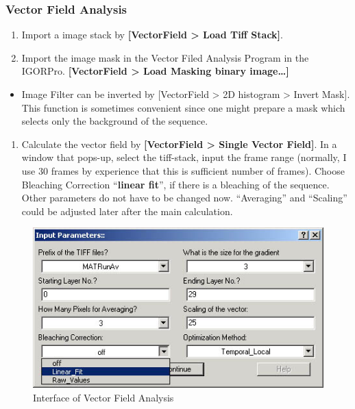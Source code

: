 \documentclass{article}
\begin{document}
\subsubsection{Vector Field Analysis}\label{vector-field-analysis}

\begin{enumerate}
\def\labelenumi{\arabic{enumi}.}
\item
  Import a image stack by \textbf{{[}VectorField \textgreater{} Load
  Tiff Stack{]}}.
\item
  Import the image mask in the Vector Filed Analysis Program in the
  IGORPro. \textbf{{[}VectorField \textgreater{} Load Masking binary
  image\ldots{}{]}}
\end{enumerate}

\begin{itemize}
\itemsep1pt\parskip0pt
\item
  Image Filter can be inverted by {[}VectorField \textgreater{} 2D
  histogram \textgreater{} Invert Mask{]}. This function is sometimes
  convenient since one might prepare a mask which selects only the
  background of the sequence.
\end{itemize}

\begin{enumerate}
\def\labelenumi{\arabic{enumi}.}
\setcounter{enumi}{2}
\itemsep1pt\parskip0pt
\item
  Calculate the vector field by \textbf{{[}VectorField \textgreater{}
  Single Vector Field{]}}. In a window that pops-up, select the
  tiff-stack, input the frame range (normally, I use 30 frames by
  experience that this is sufficient number of frames). Choose Bleaching
  Correction ``\textbf{linear fit}'', if there is a bleaching of the
  sequence. Other parameters do not have to be changed now.
  ``Averaging'' and ``Scaling'' could be adjusted later after the main
  calculation.
\end{enumerate}

\begin{figure}[!ht]
\begin{center}
\includegraphics[scale=0.6]{img/veccalcPara041216.jpg}
\caption{ Interface of Vector Field Analysis}
\label{fig:vecfieldGUI}
\end{center}
\end{figure}
\end{document}
